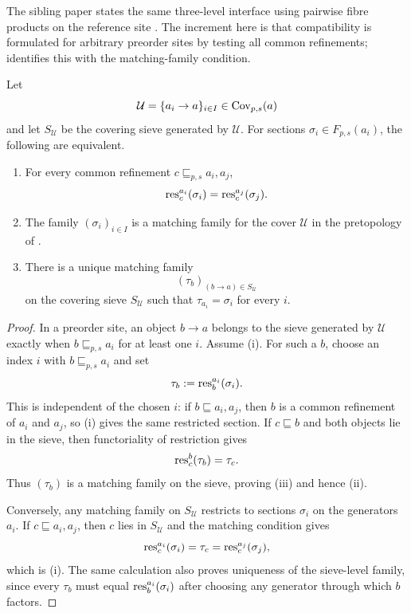 \begin{remark}
The sibling paper states the same three-level interface using pairwise fibre
products on the reference site \cite[Definition~4.4]{HomologicalVisibilityGluingObstructions2026}.
The increment here is that compatibility is formulated for arbitrary preorder
sites by testing all common refinements; 
identifies this with the matching-family condition.
\end{remark}

\begin{lemma}\label{lem:common-refinement-matching-family}
Let
\[
\mathcal U=\{a_i\to a\}_{i\in I}\in\mathrm{Cov}_{p,s}(a)
\]
and let $S_{\mathcal U}$ be the covering sieve generated by $\mathcal U$. For
sections $\sigma_i\in F_{p,s}(a_i)$, the following are equivalent.
\begin{enumerate}[label=(\roman*),nosep]
\item For every common refinement $c\sqsubseteq_{p,s}a_i,a_j$,
\[
\mathrm{res}_c^{a_i}(\sigma_i)=\mathrm{res}_c^{a_j}(\sigma_j).
\]
\item The family $(\sigma_i)_{i\in I}$ is a matching family for the cover
$\mathcal U$ in the pretopology of .
\item There is a unique matching family
\[
(\tau_b)_{(b\to a)\in S_{\mathcal U}}
\]
on the covering sieve $S_{\mathcal U}$ such that
$\tau_{a_i}=\sigma_i$ for every $i$.
\end{enumerate}
\end{lemma}

\begin{proof}
In a preorder site, an object $b\to a$ belongs to the sieve generated by
$\mathcal U$ exactly when $b\sqsubseteq_{p,s}a_i$ for at least one $i$. Assume
\textup{(i)}. For such a $b$, choose an index $i$ with
$b\sqsubseteq_{p,s}a_i$ and set
\[
\tau_b:=\mathrm{res}_b^{a_i}(\sigma_i).
\]
This is independent of the chosen $i$: if $b\sqsubseteq a_i,a_j$, then $b$ is a
common refinement of $a_i$ and $a_j$, so \textup{(i)} gives the same restricted
section. If $c\sqsubseteq b$ and both objects lie in the sieve, then functoriality
of restriction gives
\[
\mathrm{res}_c^b(\tau_b)=\tau_c.
\]
Thus $(\tau_b)$ is a matching family on the sieve, proving \textup{(iii)} and
hence \textup{(ii)}.

Conversely, any matching family on $S_{\mathcal U}$ restricts to sections
$\sigma_i$ on the generators $a_i$. If $c\sqsubseteq a_i,a_j$, then $c$ lies in
$S_{\mathcal U}$ and the matching condition gives
\[
\mathrm{res}_c^{a_i}(\sigma_i)=\tau_c=\mathrm{res}_c^{a_j}(\sigma_j),
\]
which is \textup{(i)}. The same calculation also proves uniqueness of the
sieve-level family, since every $\tau_b$ must equal
$\mathrm{res}_b^{a_i}(\sigma_i)$ after choosing any generator through which $b$ factors.
\end{proof}

